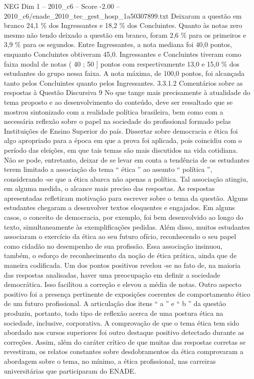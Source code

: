 \begin{textsample}{NEG Dim 1 – 2010\_c6 – Score -2.00 – 2010\_c6/enade\_2010\_tec\_gest\_hosp\_1a50307899.txt}
Deixaram a questão em branco 24,1 \% dos Ingressantes e 18,2 \% dos Concluintes.
Quanto às notas zero mesmo não tendo deixado a questão em branco, foram 2,6 \% para os primeiros e 3,9 \% para os segundos.
Entre Ingressantes, a nota mediana foi 40,0 pontos, enquanto Concluintes obtiveram 45,0.
Ingressantes e Concluintes tiveram como faixa modal de notas ( 40 ; 50 ] pontos com respectivamente 13,0 e 15,0 \% dos estudantes do grupo nessa faixa.
A nota máxima, de 100,0 pontos, foi alcançada tanto pelos Concluintes quanto pelos Ingressantes. 3.3.1.2 Comentários sobre as respostas à Questão Discursiva 9 No que tange mais precisamente à atualidade do tema proposto e ao desenvolvimento do conteúdo, deve ser ressaltado que se mostrou sintonizado com a realidade política brasileira, bem como com a necessária reflexão sobre o papel na sociedade do profissional formado pelas Instituições de Ensino Superior do país.
Dissertar sobre democracia e ética foi algo apropriado para a época em que a prova foi aplicada, pois coincidiu com o período das eleições, em que tais temas são mais discutidos na vida cotidiana.
Não se pode, entretanto, deixar de se levar em conta a tendência de os estudantes terem limitado a associação do tema “ ética ” ao assunto “ política ”, considerando -se que a ética abarca não apenas a política.
Tal associação atingiu, em alguma medida, o alcance mais preciso das respostas.
As respostas apresentadas refletiram motivação para escrever sobre o tema da questão.
Alguns estudantes chegaram a desenvolver textos eloquentes e engajados.
Em alguns casos, o conceito de democracia, por exemplo, foi bem desenvolvido ao longo do texto, simultaneamente às exemplificações pedidas.
Além disso, muitos estudantes associaram o exercício da ética ao seu futuro ofício, reconhecendo o seu papel como cidadão no desempenho de sua profissão.
Essa associação insinuou, também, o esforço de reconhecimento da noção de ética prática, ainda que de maneira codificada.
Um dos pontos positivos revelou -se no fato de, na maioria das respostas analisadas, haver uma preocupação em definir a sociedade democrática.
Isso facilitou a correção e elevou a média de notas.
Outro aspecto positivo foi a presença pertinente de exposições coerentes de comportamento ético de um futuro profissional.
A articulação dos itens “ a ” e “ b ” da questão produziu, portanto, todo tipo de reflexão acerca de uma postura ética na sociedade, inclusive, corporativa.
A comprovação de que o tema ética tem sido abordado nos cursos superiores foi outro destaque positivo detectado durante as correções.
Assim, além do caráter crítico de que muitas das respostas corretas se revestiram, os relatos constantes sobre desdobramentos da ética comprovaram a abordagem sobre o tema, no mínimo, a ética profissional, nas carreiras universitárias que participaram do ENADE.

\end{textsample}
